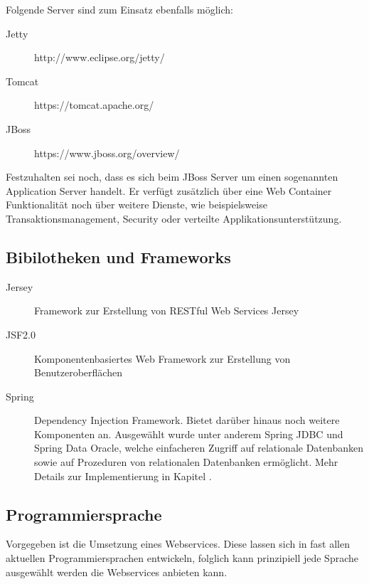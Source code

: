 Folgende Server sind zum Einsatz ebenfalls möglich:

\begin{description}
\item[Jetty] http://www.eclipse.org/jetty/
\item[Tomcat] https://tomcat.apache.org/
\item[JBoss] https://www.jboss.org/overview/
\end{description}

Festzuhalten sei noch, dass es sich beim JBoss Server um einen sogenannten Application Server handelt. Er verfügt zusätzlich über eine Web Container Funktionalität noch über weitere Dienste, wie beispielsweise Transaktionsmanagement, Security oder verteilte Applikationsunterstützung. 

\subsection{Bibilotheken und Frameworks} \label{bibliotheken_und_frameworks}
\begin{description}

\item[Jersey] Framework zur Erstellung von RESTful Web Services \gls{Jersey}
\item[JSF2.0] Komponentenbasiertes Web Framework zur Erstellung von Benutzeroberflächen 
\item[Spring] Dependency Injection Framework. Bietet darüber hinaus noch weitere Komponenten an. Ausgewählt wurde unter anderem \gls{Spring} JDBC und \gls{Spring} Data Oracle, welche einfacheren Zugriff auf relationale Datenbanken sowie auf Prozeduren von relationalen Datenbanken ermöglicht. Mehr Details zur Implementierung in Kapitel .  
    
\end{description}


\subsection{Programmiersprache}
Vorgegeben ist die Umsetzung eines \glspl{Webservice}. Diese lassen sich in fast allen aktuellen Programmiersprachen entwickeln, folglich kann prinzipiell jede Sprache ausgewählt werden die Webservices anbieten kann.  

